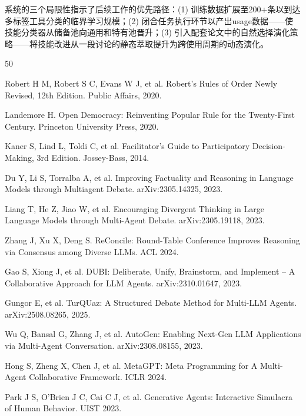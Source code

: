 \documentclass[twocolumn,10.5pt]{ctexart}
\begin{document}
系统的三个局限性指示了后续工作的优先路径：(1) 训练数据扩展至200+条以到达多标签工具分类的临界学习规模；(2) 闭合任务执行环节以产出usage数据——使技能分类器从储备池向通用和特有池晋升；(3) 引入配套论文中的自然选择演化策略——将技能改进从一段讨论的静态萃取提升为跨使用周期的动态演化。

\newpage
\begin{thebibliography}{50}

Robert H M, Robert S C, Evans W J, et al.
\newblock Robert's Rules of Order Newly Revised, 12th Edition.
\newblock Public Affairs, 2020.

Landemore H.
\newblock Open Democracy: Reinventing Popular Rule for the Twenty-First Century.
\newblock Princeton University Press, 2020.

Kaner S, Lind L, Toldi C, et al.
\newblock Facilitator's Guide to Participatory Decision-Making, 3rd Edition.
\newblock Jossey-Bass, 2014.

Du Y, Li S, Torralba A, et al.
\newblock Improving Factuality and Reasoning in Language Models through Multiagent Debate.
\newblock arXiv:2305.14325, 2023.

Liang T, He Z, Jiao W, et al.
\newblock Encouraging Divergent Thinking in Large Language Models through Multi-Agent Debate.
\newblock arXiv:2305.19118, 2023.

Zhang J, Xu X, Deng S.
\newblock ReConcile: Round-Table Conference Improves Reasoning via Consensus among Diverse LLMs.
\newblock ACL 2024.

Gao S, Xiong J, et al.
\newblock DUBI: Deliberate, Unify, Brainstorm, and Implement -- A Collaborative Approach for LLM Agents.
\newblock arXiv:2310.01647, 2023.

Gungor E, et al.
\newblock TurQUaz: A Structured Debate Method for Multi-LLM Agents.
\newblock arXiv:2508.08265, 2025.

Wu Q, Bansal G, Zhang J, et al.
\newblock AutoGen: Enabling Next-Gen LLM Applications via Multi-Agent Conversation.
\newblock arXiv:2308.08155, 2023.

Hong S, Zheng X, Chen J, et al.
\newblock MetaGPT: Meta Programming for A Multi-Agent Collaborative Framework.
\newblock ICLR 2024.

Park J S, O'Brien J C, Cai C J, et al.
\newblock Generative Agents: Interactive Simulacra of Human Behavior.
\newblock UIST 2023.


\end{thebibliography}
\end{document}
